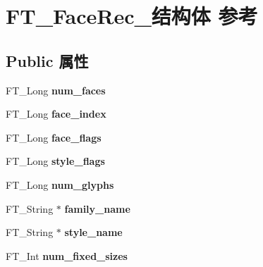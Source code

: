 \hypertarget{struct_f_t___face_rec__}{}\section{F\+T\+\_\+\+Face\+Rec\+\_\+结构体 参考}
\label{struct_f_t___face_rec__}
\subsection*{Public 属性}
\begin{DoxyCompactItemize}
\item 
\mbox{\label{struct_f_t___face_rec___af28be4cba102baaeb09d8e24b71e88fe}} 
F\+T\+\_\+\+Long {\bfseries num\+\_\+faces}
\item 
\mbox{\label{struct_f_t___face_rec___ab9a5640eb25bd3c743b3d725edd68a87}} 
F\+T\+\_\+\+Long {\bfseries face\+\_\+index}
\item 
\mbox{\label{struct_f_t___face_rec___af1596857ebc9f8eac4c4b51c8f3ffd31}} 
F\+T\+\_\+\+Long {\bfseries face\+\_\+flags}
\item 
\mbox{\label{struct_f_t___face_rec___ab06fc56f19fc1bf51cbed9bd621d3835}} 
F\+T\+\_\+\+Long {\bfseries style\+\_\+flags}
\item 
\mbox{\label{struct_f_t___face_rec___a58348bc3e0e113e8c73de9c318a9bd7a}} 
F\+T\+\_\+\+Long {\bfseries num\+\_\+glyphs}
\item 
\mbox{\label{struct_f_t___face_rec___ae07b64a64466aa7ae2b9066e9336ac8b}} 
F\+T\+\_\+\+String $\ast$ {\bfseries family\+\_\+name}
\item 
\mbox{\label{struct_f_t___face_rec___abd855b9e48b1f377b22176fb97668d7b}} 
F\+T\+\_\+\+String $\ast$ {\bfseries style\+\_\+name}
\item 
\mbox{\label{struct_f_t___face_rec___aa652af958546eb8edf87ccd4b697bfdf}} 
F\+T\+\_\+\+Int {\bfseries num\+\_\+fixed\+\_\+sizes}
\item 
\mbox{\label{struct_f_t___face_rec___a563ca9007f754aa0f711ba67050f3e47}} 

\end{DoxyCompactItemize}
